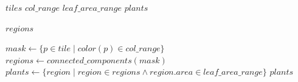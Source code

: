 \documentclass[journal,article,submit,pdftex,moreauthors]{Definitions/mdpi}
\begin{document}
\begin{algorithm}
  \caption{H1}
  \label{alg:H1}
  \begin{algorithmic}[1]
  \Require $tiles$ 
  \Require $col\_range$ 
  \Require $leaf\_area\_range$ 
  \Ensure $plants$ 
  
   \cite{wuOptimizingConnectedComponent2005} 
      \State \Return $regions$
  \EndFunction
  
    \State $mask \gets \{p \in tile \mid color(p) \in col\_range\}$
    \State $regions \gets connected\_components(mask)$
    \State $plants \gets \{region \mid region \in regions \land region.area \in leaf\_area\_range\}$
  \EndFor
  \State \Return $plants$
\end{algorithmic}
\end{algorithm}
\end{document}
